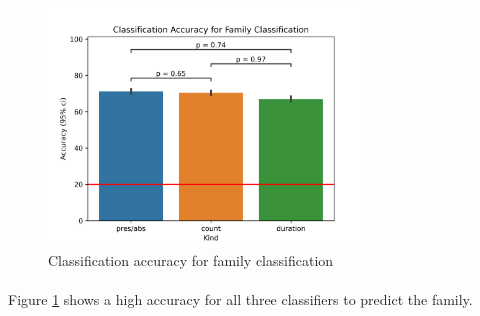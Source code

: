 \documentclass{article}
\begin{document}
\begin{figure}[!h]
\begin{centering}
\includegraphics[width=0.75\textwidth]{./figures/EP_fam_class_acc.png}
\caption{Classification accuracy for family classification}
\label{ep_fam_class_acc}
\end{centering}
\end{figure}

\paragraph{}
Figure \ref{ep_fam_class_acc} shows a high accuracy for all three classifiers to predict the family.
\end{document}
